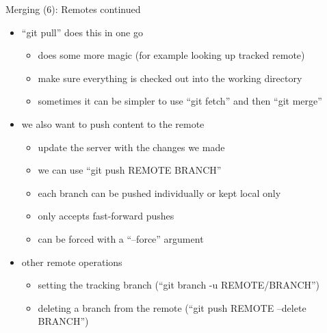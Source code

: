 \begin{frame}[fragile]{Merging (6): Remotes continued}
  \begin{itemize}
    
    \item ``git pull'' does this in one go
    \begin{itemize}
      \item does some more magic (for example looking up tracked remote)
      \item make sure everything is checked out into the working directory
      \item sometimes it can be simpler to use ``git fetch'' and then ``git merge''
    \end{itemize}
    
    \item we also want to push content to the remote
    \begin{itemize}
      \item update the server with the changes we made
      \item we can use ``git push REMOTE BRANCH''
      \item each branch can be pushed individually or kept local only
      \item only accepts fast-forward pushes
      \item can be forced with a ``--force'' argument
    \end{itemize}
    
    \item other remote operations
    \begin{itemize}
      \item setting the tracking branch (``git branch -u REMOTE/BRANCH'')
      \item deleting a branch from the remote (``git push REMOTE --delete BRANCH'')
    \end{itemize}
  \end{itemize}
\end{frame}